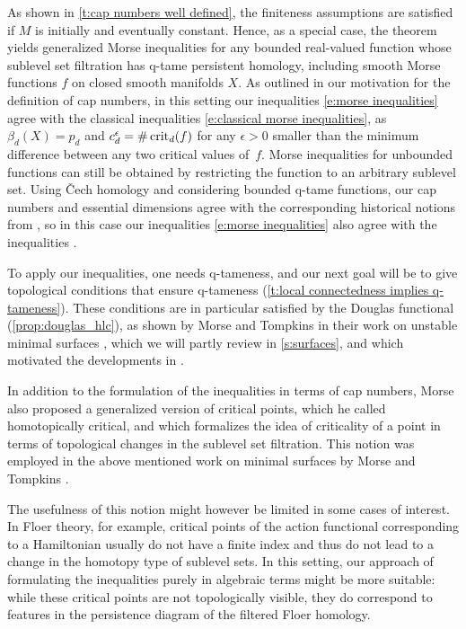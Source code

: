 As shown in \cref{t:cap numbers well defined}, the finiteness assumptions are satisfied if $M$ is initially and eventually constant.
Hence, as a special case, the theorem yields generalized Morse inequalities for any bounded real-valued function whose sublevel set filtration has q-tame persistent homology, including smooth Morse functions $f$ on closed smooth manifolds $X$.
As outlined in our motivation for the definition of cap numbers, in this setting our inequalities \eqref{e:morse inequalities} agree with the classical inequalities \eqref{e:classical morse inequalities}, as $\beta_d(X) = p_d$ and $c_d^{\epsilon} = \# \operatorname{crit}_d(f)$ for any $\epsilon > 0$ smaller than the minimum difference between any two critical values of~$f$.
Morse inequalities for unbounded functions can still be obtained by restricting the function to an arbitrary sublevel set.
Using \v{C}ech homology and considering bounded q-tame functions, our cap numbers and essential dimensions agree with the corresponding historical notions from \cite{Morse.1940}, so in this case our inequalities \eqref{e:morse inequalities} also agree with the inequalities \cite[Corollary~12.3]{Morse.1940}.

To apply our inequalities, one needs q-tameness, and our next goal will be to give topological conditions that ensure q-tameness (\cref{t:local connectedness implies q-tameness}).
These conditions are in particular satisfied by the Douglas functional (\cref{prop:douglas_hlc}), as shown by Morse and Tompkins in their work on unstable minimal surfaces \cite{Morse.1939}, which we will partly review in \cref{s:surfaces}, and which motivated the developments in \cite{Morse.1940}.

\begin{rem} \label{r:homotopically critial points}
	In addition to the formulation of the inequalities in terms of cap numbers, Morse also proposed a generalized version of critical points, which he called homotopically critical, and which formalizes the idea of criticality of a point in terms of topological changes in the sublevel set filtration.
	This notion was employed in the above mentioned work on minimal surfaces by Morse and Tompkins \cite{Morse.1939}.
	
	The usefulness of this notion might however be limited in some cases of interest.
	In Floer theory, for example, critical points of the action functional corresponding to a Hamiltonian usually do not have a finite index and thus do not lead to a change in the homotopy type of sublevel sets.
	In this setting, our approach of formulating the inequalities purely in algebraic terms might be more suitable: while these critical points are not topologically visible, they do correspond to features in the persistence diagram of the filtered Floer homology.
\end{rem}
